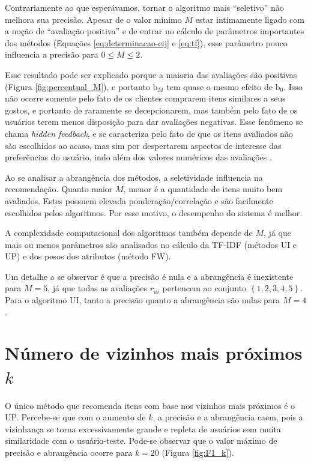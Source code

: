Contrariamente ao que esperávamos, tornar o algoritmo mais ``seletivo'' não melhora sua precisão. Apesar de o valor mínimo $M$ estar intimamente ligado com a noção de ``avaliação positiva'' e de entrar no cálculo de parâmetros importantes dos métodos (Equações \ref{eq:determinacao-eij} e \ref{eq:tf}), esse parâmetro pouco influencia a precisão para $0 \leq M \leq 2$. 

Esse resultado pode ser explicado porque a maioria das avaliações são positivas (Figura \ref{fig:percentual_M}), e portanto $\mathrm{b}_M$ tem quase o mesmo efeito de $\mathrm{b}_0$. Isso não ocorre somente pelo fato de os clientes comprarem itens similares a seus gostos, e portanto de raramente se decepcionarem, mas também pelo fato de os usuários terem menos disposição para dar avaliações negativas. Esse fenômeno se chama \textit{hidden feedback}, e se caracteriza pelo fato de que os itens avaliados não são escolhidos ao acaso, mas sim por despertarem aspectos de interesse das preferências do usuário, indo além dos valores numéricos das avaliações \cite{lops2011content-chap5}.

Ao se analisar a abrangência dos métodos, a seletividade influencia na recomendação. Quanto maior $M$, menor é a quantidade de itens muito bem avaliados. Estes possuem elevada ponderação/correlação e são facilmente escolhidos pelos algoritmos. Por esse motivo, o desempenho do sistema é melhor.

A complexidade computacional dos algoritmos também depende de $M$, já que mais ou menos parâmetros são analisados no cálculo da TF-IDF (métodos UI e UP) e dos pesos dos atributos (método FW).

Um detalhe a se observar é que a precisão é nula e a abrangência é inexistente para $M=5$, já que todas as avaliações $r_{ui}$ pertencem ao conjunto $\left\{1,2,3,4,5\right\}$. 
Para o algoritmo UI, tanto a precisão quanto a abrangência são nulas para $M=4$.

\section{Número de vizinhos mais próximos $k$} %
\label{sec:n_mero_de_vizinhos_mais_pr_ximos_}

O único método que recomenda itens com base nos vizinhos mais próximos é o UP. Percebe-se que com o aumento de $k$, a precisão e a abrangência caem, pois a vizinhança se torna excessivamente grande e repleta de usuários sem muita similaridade com o usuário-teste. Pode-se observar que o valor máximo de precisão e abrangência ocorre para $k=20$ (Figura \ref{fig:F1_k}).

